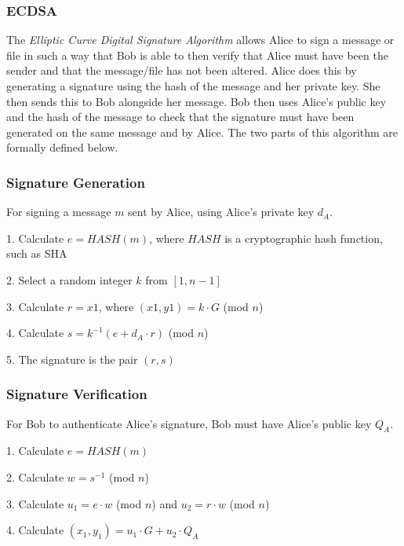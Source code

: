 \documentclass[12pt,a4paper]{article}
\begin{document}
\subsubsection{ECDSA} \noindent \label{ECDSA}
The \emph{Elliptic Curve Digital Signature Algorithm} allows Alice to sign a message or file in such a way that Bob is able to then 
verify that Alice must have been the sender and that the message/file has not been altered. 
Alice does this by generating a signature using the hash of the message and her private key. 
She then sends this to Bob alongside her message. 
Bob then uses Alice's public key and the hash of the message to check that the signature must have been generated on the same message and by Alice. 
The two parts of this algorithm are formally defined below. 

\subsubsection{Signature Generation} \noindent \label{Signature Generation}
For signing a message $m$ sent by Alice, using Alice's private key $d_A$.

\vspace{1mm}

1. \space Calculate $e = HASH(m)$, where $HASH$ is a cryptographic hash function, such as SHA

2. \space Select a random integer $k$ from $[1,n-1]$

3. \space Calculate $r = x1$, where $(x1,y1) = k \cdot G$ (mod $n$)

4. \space Calculate $s = k^{-1}(e+d_A \cdot r)$ (mod $n$)

5. \space The signature is the pair $(r,s)$

\subsubsection{Signature Verification} \noindent \label{Signature Verification}
For Bob to authenticate Alice's signature, Bob must have Alice's public key $Q_A$.

\vspace{1mm}

1. \space Calculate $e = HASH(m)$

2. \space Calculate $w = s^{-1}$ (mod $n$)

3. \space Calculate $u_1 = e \cdot w$ (mod $n$) and $u_2 = r \cdot w$ (mod $n$)

4. \space Calculate $(x_1,y_1) = u_1 \cdot G + u_2 \cdot Q_A$
\end{document}
